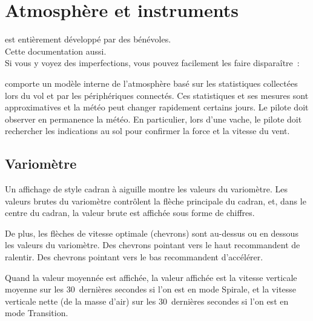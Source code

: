 
\chapter{Atmosphère et instruments}\label{cha:atmosph}

\begin{framed}
	\begin{center}
		\xc{} est entièrement développé par des bénévoles.\\
		Cette documentation aussi.\\
		Si vous y voyez des imperfections, vous pouvez facilement les faire disparaître~:\\
	\end{center}
\end{framed}

\xc{} comporte un modèle interne de l'atmosphère basé sur les statistiques collectées lors du vol et par les périphériques connectés.
Ces statistiques et ses mesures sont approximatives et la météo peut changer rapidement certains jours.
Le pilote doit observer en permanence la météo.
En particulier, lors d'une vache, le pilote doit rechercher les indications au sol pour confirmer la force et la vitesse du vent.

\section{Variomètre}\label{sec:variometer}

Un affichage de style cadran à aiguille montre les valeurs du variomètre.
Les valeurs brutes du variomètre contrôlent la flèche principale du cadran, et, dans le centre du cadran, la valeur brute est affichée sous forme de chiffres.

De plus, les flèches de vitesse optimale (chevrons) sont au-dessus ou en dessous les valeurs du variomètre.
Des chevrons pointant vers le haut recommandent de ralentir.
Des chevrons pointant vers le bas recommandent d'accélérer.

Quand la valeur moyennée est affichée, la valeur affichée est la vitesse verticale moyenne sur les 30~dernières secondes si l'on est en mode Spirale, et la vitesse verticale nette (de la masse d'air) sur les 30~dernières secondes si l'on est en mode Transition.


